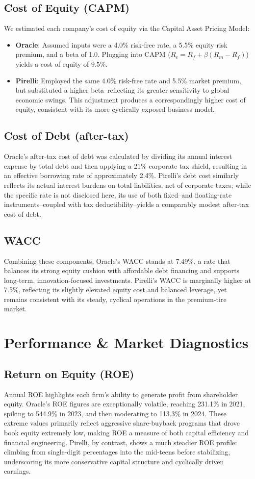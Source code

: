 \documentclass[12pt,a4paper]{report}
\begin{document}
\section{Cost of Equity (CAPM)}
We estimated each company's cost of equity via the Capital Asset Pricing Model:
\begin{itemize}
\item \textbf{Oracle}: Assumed inputs were a 4.0\% risk-free rate, a 5.5\% equity risk premium, and a beta of 1.0. Plugging into CAPM ($R_e=R_f+\beta(R_m-R_f)$) yields a cost of equity of 9.5\%.
\item \textbf{Pirelli}: Employed the same 4.0\% risk-free rate and 5.5\% market premium, but substituted a higher beta--reflecting its greater sensitivity to global economic swings. This adjustment produces a correspondingly higher cost of equity, consistent with its more cyclically exposed business model.
\end{itemize}

\section{Cost of Debt (after-tax)}
Oracle's after-tax cost of debt was calculated by dividing its annual interest expense by total debt and then applying a 21\% corporate tax shield, resulting in an effective borrowing rate of approximately 2.4\%. Pirelli's debt cost similarly reflects its actual interest burdens on total liabilities, net of corporate taxes; while the specific rate is not disclosed here, its use of both fixed--and floating-rate instruments--coupled with tax deductibility--yields a comparably modest after-tax cost of debt.

\section{WACC}
Combining these components, Oracle's WACC stands at 7.49\%, a rate that balances its strong equity cushion with affordable debt financing and supports long-term, innovation-focused investments. Pirelli's WACC is marginally higher at 7.5\%, reflecting its slightly elevated equity cost and balanced leverage, yet remains consistent with its steady, cyclical operations in the premium-tire market.

\chapter{Performance \& Market Diagnostics}
\section{Return on Equity (ROE)}
Annual ROE highlights each firm's ability to generate profit from shareholder equity. Oracle's ROE figures are exceptionally volatile, reaching 231.1\% in 2021, spiking to 544.9\% in 2023, and then moderating to 113.3\% in 2024. These extreme values primarily reflect aggressive share-buyback programs that drove book equity extremely low, making ROE a measure of both capital efficiency and financial engineering. Pirelli, by contrast, shows a much steadier ROE profile: climbing from single-digit percentages into the mid-teens before stabilizing, underscoring its more conservative capital structure and cyclically driven earnings.
\end{document}
